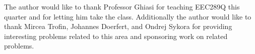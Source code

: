 \documentclass[sigconf]{acmart}
\begin{document}
\begin{acks}
The author would like to thank Professor Ghiasi for teaching EEC289Q this quarter and for letting him take the
class. Additionally the author would like to thank Mircea Trofin, Johannes Doerfert, and Ondrej Sykora for providing
interesting problems related to this area and sponsoring work on related problems.
\end{acks}




\appendix
\end{document}
